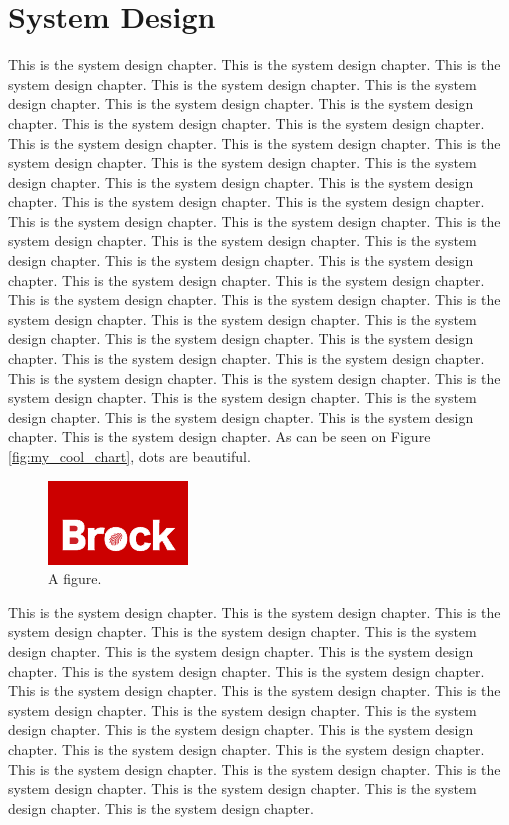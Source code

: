 \chapter{System Design}
\label{system}

This is the system design chapter.
This is the system design chapter.
This is the system design chapter.
This is the system design chapter.
This is the system design chapter.
This is the system design chapter.
This is the system design chapter.
This is the system design chapter.
This is the system design chapter.
This is the system design chapter.
This is the system design chapter.
This is the system design chapter.
This is the system design chapter.
This is the system design chapter.
This is the system design chapter.
This is the system design chapter.
This is the system design chapter.
This is the system design chapter.
This is the system design chapter.
This is the system design chapter.
This is the system design chapter.
This is the system design chapter.
This is the system design chapter.
This is the system design chapter.
This is the system design chapter.
This is the system design chapter.
This is the system design chapter.
This is the system design chapter.
This is the system design chapter.
This is the system design chapter.
This is the system design chapter.
This is the system design chapter.
This is the system design chapter.
This is the system design chapter.
This is the system design chapter.
This is the system design chapter.
This is the system design chapter.
This is the system design chapter.
This is the system design chapter.
This is the system design chapter.
This is the system design chapter.
This is the system design chapter.
This is the system design chapter.
This is the system design chapter.
As can be seen on Figure \ref{fig:my_cool_chart}, dots are beautiful.

\begin{figure}[!htb]
\begin{center}
\includegraphics[scale=1.0]{Brock_Logo.png}
\end{center}
\caption{A figure.}
\label{logo}
\end{figure}
This is the system design chapter.
This is the system design chapter.
This is the system design chapter.
This is the system design chapter.
This is the system design chapter.
This is the system design chapter.
This is the system design chapter.
This is the system design chapter.
This is the system design chapter.
This is the system design chapter.
This is the system design chapter.
This is the system design chapter.
This is the system design chapter.
This is the system design chapter.
This is the system design chapter.
This is the system design chapter.
This is the system design chapter.
This is the system design chapter.
This is the system design chapter.
This is the system design chapter.
This is the system design chapter.
This is the system design chapter.
This is the system design chapter.
This is the system design chapter.



